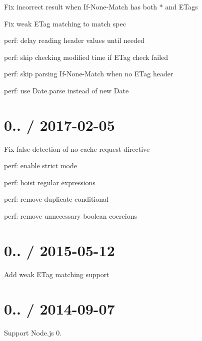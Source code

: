 
\begin{DoxyItemize}
\item Fix incorrect result when {\ttfamily If-\/\+None-\/\+Match} has both {\ttfamily $\ast$} and E\+Tags
\item Fix weak {\ttfamily E\+Tag} matching to match spec
\item perf\+: delay reading header values until needed
\item perf\+: skip checking modified time if E\+Tag check failed
\item perf\+: skip parsing {\ttfamily If-\/\+None-\/\+Match} when no {\ttfamily E\+Tag} header
\item perf\+: use {\ttfamily Date.\+parse} instead of {\ttfamily new Date}
\end{DoxyItemize}

\section*{0.. / 2017-\/02-\/05 }


\begin{DoxyItemize}
\item Fix false detection of {\ttfamily no-\/cache} request directive
\item perf\+: enable strict mode
\item perf\+: hoist regular expressions
\item perf\+: remove duplicate conditional
\item perf\+: remove unnecessary boolean coercions
\end{DoxyItemize}

\section*{0.. / 2015-\/05-\/12 }


\begin{DoxyItemize}
\item Add weak {\ttfamily E\+Tag} matching support
\end{DoxyItemize}

\section*{0.. / 2014-\/09-\/07 }


\begin{DoxyItemize}
\item Support Node.\+js 0.
\end{DoxyItemize}

